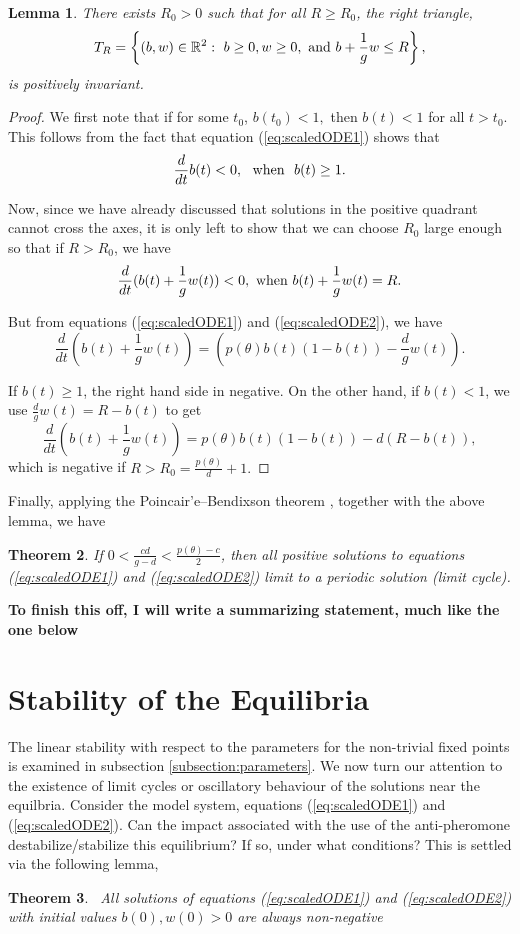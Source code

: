\documentclass[review,authoryear]{elsarticle}
\newtheorem{theorem}{Theorem}[section]
\newtheorem{lemma}[theorem]{Lemma}
\begin{document}
\begin{lemma}
There exists $R_{0}>0$  such that for all $R\geq R_{0}$, the right
triangle, 
$$T_{R}=\left\{ \left(b,w\right) \in \mathbb R^{2}:\  b\ge 0, w\ge 0, \ {\rm and}\  b+\frac{1}{g}w\le R\right\}, $$  
is positively invariant.
\end{lemma}

\begin{proof}
  We first note that if for some $t_0$, $b(t_0)< 1,$ then $b(t) < 1$ for all $t>t_0$.  This follows from the fact that equation (\ref{eq:scaledODE1}) shows that 
  $$\frac{d}{dt}b(t) < 0,\  \  {\rm when}\ \ b(t)\ge 1.$$
  
  Now, since we have already discussed that solutions in the positive quadrant cannot cross the axes, it is only left to show that we can choose $R_0$ large enough so that if $R>R_0$, we have
  $$\frac{d}{dt}(b(t)+\frac{1}{g}w(t)) <0,\  {\rm when}\  b(t)+\frac{1}{g}w(t) =R.$$
  
  But from equations (\ref{eq:scaledODE1}) and (\ref{eq:scaledODE2}), we have
  $$\frac{d}{dt}(b(t)+\frac{1}{g}w(t))  =\left( p\left( \theta \right) b(t)\left( 1-b(t)\right) -\frac{d}{g}
w\left( t\right) \right). $$

If $b(t) \ge 1$, the right hand side in negative.  On the other hand, if $b(t) < 1$, we use $\frac{d}{g}w(t) = R-b(t)$ to get
$$\frac{d}{dt}(b(t)+\frac{1}{g}w(t)) =p\left( \theta \right) b(t)\left(
1-b(t)\right) -d\left( R-b(t)\right),$$
which is negative if $R>R_0= \frac{p(\theta)}{d} +1.$
\end{proof}

Finally, applying the Poincair'e--Bendixson theorem \citep{nonlinearChaos}, together with the above lemma, we have

\begin{theorem}
  If $0 < \frac{cd}{g-d} < \frac{p(\theta) -c}{2}$, then all positive solutions to equations (\ref{eq:scaledODE1}) and (\ref{eq:scaledODE2}) limit to a periodic solution (limit cycle).
\end{theorem}

\textbf{To finish this off, I will write a summarizing statement, much like the one below}
\section{Stability of the Equilibria}
\label{appendix:stability}

The linear stability with respect to the parameters for the
non-trivial fixed points is examined in subsection 
\ref{subsection:parameters}. We now turn our attention to the
existence of limit cycles or oscillatory behaviour of the solutions
near the equilbria. Consider the model system, equations
(\ref{eq:scaledODE1}) and (\ref{eq:scaledODE2}). Can the impact
associated with the use of the anti-pheromone destabilize/stabilize
this equilibrium? If so, under what conditions? This is settled via
the following lemma,
\begin{theorem}
  \bigskip\ All solutions of equations (\ref{eq:scaledODE1}) and
  (\ref{eq:scaledODE2}) with initial values
  $b\left( 0\right) ,w\left( 0\right) >0$ are always non-negative
\end{theorem}
\end{document}
